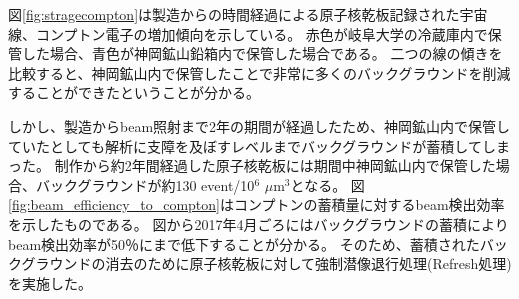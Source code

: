 \documentclass[12pt,a4paper]{jarticle}
\begin{document}
\par
図\ref{fig:stragecompton}は製造からの時間経過による原子核乾板記録された宇宙線、コンプトン電子の増加傾向を示している。
赤色が岐阜大学の冷蔵庫内で保管した場合、青色が神岡鉱山鉛箱内で保管した場合である。
二つの線の傾きを比較すると、神岡鉱山内で保管したことで非常に多くのバックグラウンドを削減することができたということが分かる。
\par
しかし、製造からbeam照射まで2年の期間が経過したため、神岡鉱山内で保管していたとしても解析に支障を及ぼすレベルまでバックグラウンドが蓄積してしまった。
制作から約2年間経過した原子核乾板には期間中神岡鉱山内で保管した場合、バックグラウンドが約130 event/10$^6$ $\mu$m$^3$となる。
図\ref{fig:beam_efficiency_to_compton}はコンプトンの蓄積量に対するbeam検出効率を示したものである。
図から2017年4月ごろにはバックグラウンドの蓄積によりbeam検出効率が50％にまで低下することが分かる。
そのため、蓄積されたバックグラウンドの消去のために原子核乾板に対して強制潜像退行処理(Refresh処理)を実施した。
\end{document}

